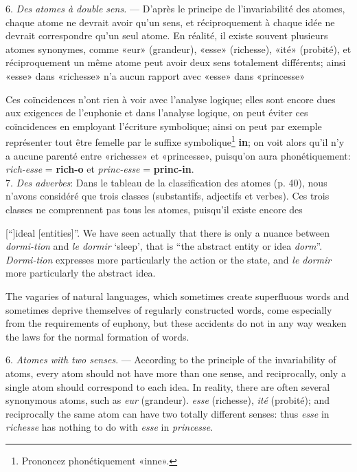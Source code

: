 \begin{sloppypar}
{{    6. \emph{Des atomes à double sens.} — D’après le principe de
    l'invariabilité des atomes, chaque atome ne devrait avoir qu’un
    sens, et réciproquement à chaque idée ne devrait correspondre
    qu’un seul atome. En réalité, il existe souvent plusieurs atomes
    synonymes, comme «eur» (grandeur), «esse» (richesse), «ité»
    (probité), et réciproquement un même atome peut avoir deux sens
    totalement différents; ainsi «esse» dans «richesse» n’a aucun
    rapport avec «esse» dans «princesse»

    Ces coïncidences n’ont rien à voir avec l’analyse logique; elles
    sont encore dues aux exigences de l’euphonie et dans l’analyse
    logique, on peut éviter ces coïncidences en employant l'écriture
    symbolique; ainsi on peut par exemple représenter tout être
    femelle par le suffixe symbolique\footnote{Prononcez
      phonétiquement «inne».}  \textbf{in}; on voit alors qu’il n’y a
    aucune parenté entre «richesse» et
    «princesse», puisqu’on aura phonétiquement:\\[1ex]

  \noindent
  \emph{rich-esse} = \textbf{rich-o} et \emph{princ-esse} =
  \textbf{princ-in}.\\[1ex]

  7. \emph{Des adverbes}: Dans le tableau de la classification des
  atomes (p. 40), nous n’avons considéré que trois classes
  (substantifs, adjectifs et verbes). Ces trois classes ne comprennent
  pas tous les atomes, puisqu’il existe encore des } }
%
{\noindent
  {\small [``]ideal [entities]''.  We have seen actually that there is
    only a nuance between \emph{dormi-tion} and \emph{le dormir} `sleep',
    that is ``the abstract entity or idea
    \emph{dorm}''. \emph{Dormi-tion} expresses more particularly the
    action or the state, and \emph{le dormir} more particularly the
    abstract idea.

    The vagaries of natural languages, which sometimes create
    superfluous words and sometimes deprive themselves of regularly
    constructed words, come especially from the requirements of
    euphony, but these accidents do not in any way weaken the laws for
    the normal formation of words.

    6. \emph{Atomes with two senses}. --- According to the principle
    of the invariability of atoms, every atom should not have more
    than one sense, and reciprocally, only a single atom should
    correspond to each idea. In reality, there are often several
    synonymous atoms, such as \emph{eur} (grandeur). \emph{esse} (richesse),
    \emph{ité} (probité); and reciprocally the same atom can have two
    totally different senses: thus \emph{esse} in \emph{richesse} has
    nothing to do with \emph{esse} in \emph{princesse}.

}}
\end{sloppypar}
